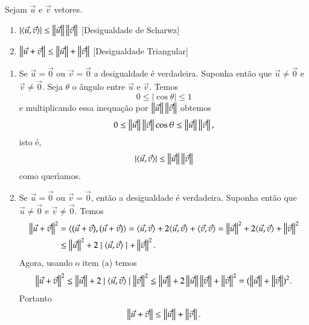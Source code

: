 \begin{proposicao}\label{DesigualdadeTriangular}
  Sejam $\vec{u}$ e $\vec{v}$ vetores.
  \begin{enumerate}
    \item $|\langle \vec{u}, \vec{v} \rangle| \le \left\Vert{\vec{u}}\right\Vert\left\Vert{\vec{v}}\right\Vert$ [Desigualdade de Scharwz]
    \item $\left\Vert{\vec{u} + \vec{v}}\right\Vert \le \left\Vert{\vec{u}}\right\Vert + \left\Vert{\vec{v}}\right\Vert$ [Desigualdade Triangular]
  \end{enumerate}
\end{proposicao}
\begin{prova}
  \begin{enumerate}
    \item Se $\vec{u} = \vec{0}$ ou $\vec{v} = \vec{0}$ a desigualdade \'e verdadeira. Suponha ent\~ao que $\vec{u} \ne \vec{0}$ e $\vec{v} \ne \vec{0}$. Seja $\theta$ o \^angulo entre $\vec{u}$ e $\vec{v}$. Temos
    \[
      0 \le |\cos\theta| \le 1
    \]
    e multiplicando essa inequa\c{c}\~ao por $\left\Vert{\vec{u}}\right\Vert\left\Vert{\vec{v}}\right\Vert$ obtemos
    \[
      0 \le \left\Vert{\vec{u}}\right\Vert\left\Vert{\vec{v}}\right\Vert\cos\theta \le \left\Vert{\vec{u}}\right\Vert\left\Vert{\vec{v}}\right\Vert,
    \]
    isto \'e,
    \[
      |\langle \vec{u}, \vec{v} \rangle| \le \left\Vert{\vec{u}}\right\Vert\left\Vert{\vec{v}}\right\Vert
    \]
    como quer{\'\i}amos.
    \item Se $\vec{u} = \vec{0}$ ou $\vec{v} = \vec{0}$, ent\~ao a desigualdade \'e verdadeira. Suponha ent\~ao que $\vec{u} \ne \vec{0}$ e $\vec{v} \ne \vec{0}$. Temos
    \begin{align*}
      \left\Vert{\vec{u} + \vec{v}}\right\Vert^2 &= \langle(\vec{u} + \vec{v}), (\vec{u} + \vec{v})\rangle = \langle \vec{u}, \vec{v} \rangle + 2\langle \vec{u}, \vec{v} \rangle + \langle \vec{v}, \vec{v} \rangle = \left\Vert{\vec{u}}\right\Vert^2 + 2\langle \vec{u}, \vec{v} \rangle + \left\Vert{\vec{v}}\right\Vert^2 \\ &\le \left\Vert{\vec{u}}\right\Vert^2 + 2\mid\langle \vec{u}, \vec{v} \rangle\mid + \left\Vert{\vec{v}}\right\Vert^2.
    \end{align*}
    Agora, usando o item (a) temos
    \begin{align*}
      \left\Vert{\vec{u} + \vec{v}}\right\Vert^2 \le \left\Vert{\vec{u}}\right\Vert + 2\mid\langle \vec{u}, \vec{v} \rangle\mid \left\Vert{\vec{v}}\right\Vert^2 \le \left\Vert{\vec{u}}\right\Vert + 2\left\Vert{\vec{u}}\right\Vert\left\Vert{\vec{v}}\right\Vert + \left\Vert{\vec{v}}\right\Vert^2 = (\left\Vert{\vec{u}}\right\Vert + \left\Vert{\vec{v}}\right\Vert)^2.
    \end{align*}
    Portanto
    \[
      \left\Vert{\vec{u} + \vec{v}}\right\Vert \le \left\Vert{\vec{u}}\right\Vert + \left\Vert{\vec{v}}\right\Vert.
    \]
  \end{enumerate}
\end{prova}

